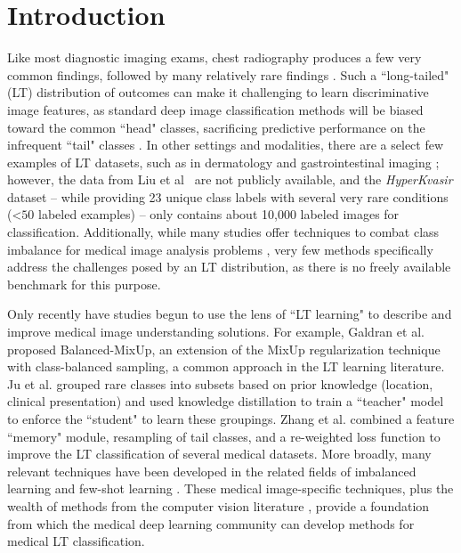 \documentclass[runningheads]{llncs}
\begin{document}
\section{Introduction}
\raggedbottom

Like most diagnostic imaging exams, chest radiography produces a few very common findings, followed by many relatively rare findings \cite{Paul2021Zeroshot,Zhou2021Review}. Such a ``long-tailed" (LT) distribution of outcomes can make it challenging to learn discriminative image features, as standard deep image classification methods will be biased toward the common ``head" classes, sacrificing predictive performance on the infrequent ``tail" classes \cite{zhang2021deep}. In other settings and modalities, there are a select few examples of LT datasets, such as in dermatology \cite{liu2020deep} and gastrointestinal imaging \cite{borgli2020hyperkvasir}; however, the data from Liu et al~\cite{liu2020deep} are not publicly available, and the \textit{HyperKvasir} dataset \cite{borgli2020hyperkvasir} -- while providing 23 unique class labels with several very rare conditions (\textless $50$ labeled examples) -- only contains about 10,000 labeled images for classification. Additionally, while many studies offer techniques to combat class imbalance for medical image analysis problems \cite{marrakchifighting2021,zhuangcare2019,linautomated2021,galdranbalanced2021}, very few methods specifically address the challenges posed by an LT distribution, as there is no freely available benchmark for this purpose.

Only recently have studies begun to use the lens of ``LT learning" to describe and improve medical image understanding solutions. For example, Galdran et al. \cite{galdranbalanced2021} proposed Balanced-MixUp, an extension of the MixUp \cite{zhang2018mixup} regularization technique with class-balanced sampling, a common approach in the LT learning literature. Ju et al. \cite{jurelational2021} grouped rare classes into subsets based on prior knowledge (location, clinical presentation) and used knowledge distillation to train a ``teacher" model to enforce the ``student" to learn these groupings. Zhang et al. \cite{zhangmbnm2021} combined a feature ``memory" module, resampling of tail classes, and a re-weighted loss function to improve the LT classification of several medical datasets. More broadly, many relevant techniques have been developed in the related fields of imbalanced learning \cite{zhuangcare2019,marrakchifighting2021} and few-shot learning \cite{quellecautomatic2020,lidifficulty2020}. These medical image-specific techniques, plus the wealth of methods from the computer vision literature \cite{chawla2002smote,huang2016learning,wang2017learning,linfocal2017,cuiclass2019,caolearning2019,shu2019meta,kangdecoupling2020,zhang2021deep,jiang2021self,park2021influence,kini2021label}, provide a foundation from which the medical deep learning community can develop methods for medical LT classification.
\end{document}
